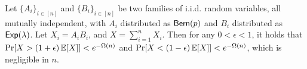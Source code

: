 
\begin{theorem}\label{thm:bern-exp}
  Let $\{ A_i \}_{i \in [n]}$ and $\{ B_i \}_{i \in [n]}$ be two families of i.i.d. random variables,
  all mutually independent,
  with $A_i$ distributed as $\textsf{Bern}(p)$ and $B_i$ distributed as $\textsf{Exp}(\lambda)$.
  Let $X_i = A_i B_i$, and $X = \sum_{i = 1}^n X_i$.
  Then for any $0 < \epsilon < 1$, it holds that
  $\Pr[X > (1 + \epsilon) \mathop{{}\mathbb{E}}[X]] < e^{-\Omega(n)}$ and
  $\Pr[X < (1 - \epsilon) \mathop{{}\mathbb{E}}[X]] < e^{-\Omega(n)}$,
  which is negligible in $n$.
\end{theorem}
